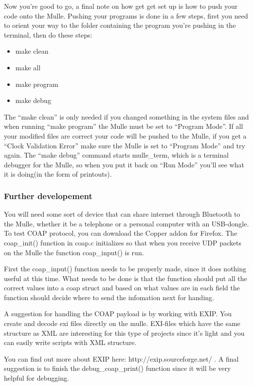 Now you're good to go, a final note on how get get set up is how to push your code onto the Mulle. Pushing your programs is done in a few steps, first you need to orient your way to the folder containing the program you're pushing in the terminal, then do these steps:
\begin{itemize}
\item make clean
\item make all
\item make program
\item make debug
\end{itemize}
The “make clean” is only needed if you changed something in the system files and when running “make program” the Mulle must be set to “Program Mode”. If all your modified files are correct your code will be pushed to the Mulle, if you get a “Clock Validation Error” make sure the Mulle is set to “Program Mode” and try again. The “make debug” command starts mulle\_term, which is a terminal debugger for the Mulle, so when you put it back on “Run Mode” you'll see what it is doing(in the form of printouts).

\subsubsection{Further developement}

You will need some sort of device that can share internet through Bluetooth to the Mulle, whether it be a telephone or a personal computer with an USB-dongle. To test COAP protocol, you can download the Copper addon for Firefox. The coap\_init() function in coap.c initializes so that when you receive UDP packets on the Mulle the function coap\_input() is run.

First the coap\_input() function needs to be properly made, since it does nothing useful at this time. What needs to be done is that the function should put all the correct values into a coap struct and based on what values are in each field the function should decide where to send the infomation next for handing. 

A suggestion for handling the COAP payload is by working with EXIP. You create and decode exi files directly on the mulle. EXI-files which have the same structure as XML are interesting for this type of projects since it's light and you can easily write scripts with XML structure.

You can find out more about EXIP here: http://exip.sourceforge.net/ .
A final suggestion is to finish the debug\_coap\_print() function since it will be very helpful for debugging.

